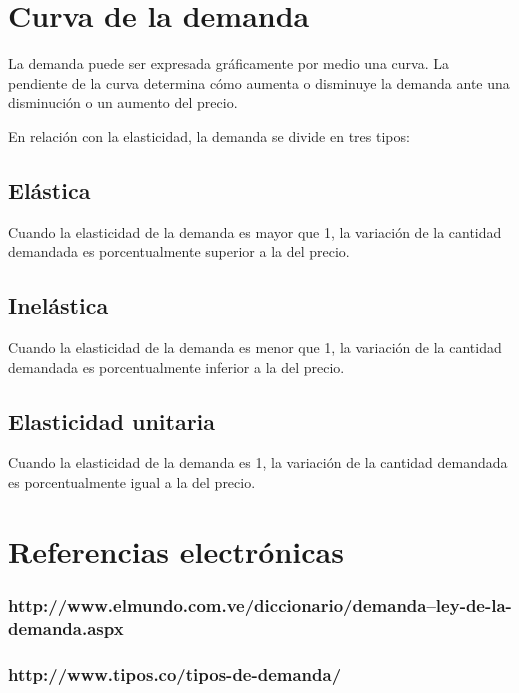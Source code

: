 \documentclass[11pt,letterpaper]{article}
\begin{document}
\section{Curva de la demanda}
La demanda puede ser expresada gráficamente por medio una curva. La pendiente de la curva determina cómo aumenta o disminuye la demanda ante una disminución o un aumento del precio. 

En relación con la elasticidad, la demanda se divide en tres tipos:

\subsection*{Elástica}
Cuando la elasticidad de la demanda es mayor que 1, la variación de la cantidad demandada es porcentualmente superior a la del precio.
\subsection*{Inelástica}
Cuando la elasticidad de la demanda es menor que 1, la variación de la cantidad demandada es porcentualmente inferior a la del precio.
\subsection*{Elasticidad unitaria}
Cuando la elasticidad de la demanda es 1, la variación de la cantidad demandada es porcentualmente igual a la del precio.

\section{Referencias electrónicas}
\subsubsection*{http://www.elmundo.com.ve/diccionario/demanda--ley-de-la-demanda.aspx}
\subsubsection*{http://www.tipos.co/tipos-de-demanda/}
\end{document}
